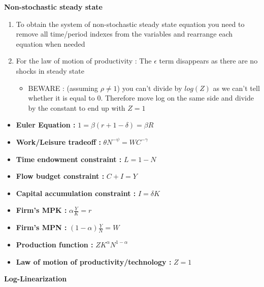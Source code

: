 \documentclass{article}
\begin{document}
\textbf{Non-stochastic steady state}
\begin{enumerate}
    \item To obtain the system of non-stochastic steady state equation you need to remove all time/period indexes from the variables and rearrange each equation when needed
    \item For the law of motion of productivity : The $\epsilon$ term disappears as there are no shocks in steady state 
    \begin{itemize}
        \item BEWARE : (assuming $\rho \neq 1$) you can't divide by $log(Z)$ as we can't tell whether it is equal to 0. Therefore move log on the same side and divide by the constant to end up with $Z=1$
    \end{itemize}
\end{enumerate}
\begin{steadystatebox}
 \begin{itemize}
        \item \textbf{Euler Equation :} $1 = \beta(r+1-\delta) = \beta R$
        \item \textbf{Work/Leisure tradeoff :} $\theta N^{-\psi} = WC^{-\gamma}$
        \item \textbf{Time endowment constraint :} $L=1-N$
        \item \textbf{Flow budget constraint :} $C+I = Y$ 
        \item \textbf{Capital accumulation constraint :} $I = \delta K$
        \item \textbf{Firm's MPK :} $\alpha\frac{Y}{K} = r$
        \item \textbf{Firm's MPN :} $(1-\alpha)\frac{Y}{N} = W$ 
        \item \textbf{Production function :} $ZK^{\alpha}N^{1-\alpha}$
        \item \textbf{Law of motion of productivity/technology :} $Z=1$
    \end{itemize}
\end{steadystatebox}
\textbf{Log-Linearization}
\end{document}
